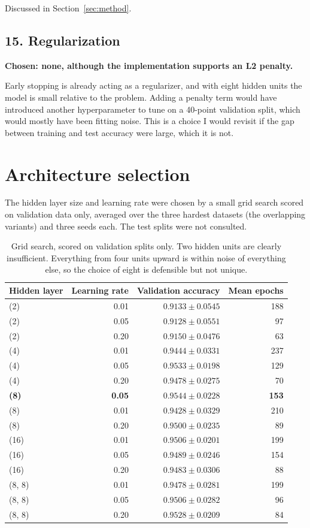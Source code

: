 \documentclass[11pt]{article}
\begin{document}
Discussed in Section~\ref{sec:method}.

\subsection*{15. Regularization}
\textbf{Chosen: none, although the implementation supports an L2 penalty.}

Early stopping is already acting as a regularizer, and with eight hidden units
the model is small relative to the problem. Adding a penalty term would have
introduced another hyperparameter to tune on a 40-point validation split, which
would mostly have been fitting noise. This is a choice I would revisit if the
gap between training and test accuracy were large, which it is not.

\section{Architecture selection}
\label{sec:arch}

The hidden layer size and learning rate were chosen by a small grid search
scored on validation data only, averaged over the three hardest datasets (the
overlapping variants) and three seeds each. The test splits were not consulted.

\begin{table}[H]
\centering
\small
\begin{tabular}{lrrr}
\toprule
Hidden layer & Learning rate & Validation accuracy & Mean epochs \\
\midrule
(2)    & 0.01 & $0.9133 \pm 0.0545$ & 188 \\
(2)    & 0.05 & $0.9128 \pm 0.0551$ &  97 \\
(2)    & 0.20 & $0.9150 \pm 0.0476$ &  63 \\
(4)    & 0.01 & $0.9444 \pm 0.0331$ & 237 \\
(4)    & 0.05 & $0.9533 \pm 0.0198$ & 129 \\
(4)    & 0.20 & $0.9478 \pm 0.0275$ &  70 \\
\textbf{(8)} & \textbf{0.05} & $\mathbf{0.9544 \pm 0.0228}$ & \textbf{153} \\
(8)    & 0.01 & $0.9428 \pm 0.0329$ & 210 \\
(8)    & 0.20 & $0.9500 \pm 0.0235$ &  89 \\
(16)   & 0.01 & $0.9506 \pm 0.0201$ & 199 \\
(16)   & 0.05 & $0.9489 \pm 0.0246$ & 154 \\
(16)   & 0.20 & $0.9483 \pm 0.0306$ &  88 \\
(8, 8) & 0.01 & $0.9478 \pm 0.0281$ & 199 \\
(8, 8) & 0.05 & $0.9506 \pm 0.0282$ &  96 \\
(8, 8) & 0.20 & $0.9528 \pm 0.0209$ &  84 \\
\bottomrule
\end{tabular}
\caption{Grid search, scored on validation splits only. Two hidden units are
clearly insufficient. Everything from four units upward is within noise of
everything else, so the choice of eight is defensible but not unique.}
\end{table}
\end{document}
